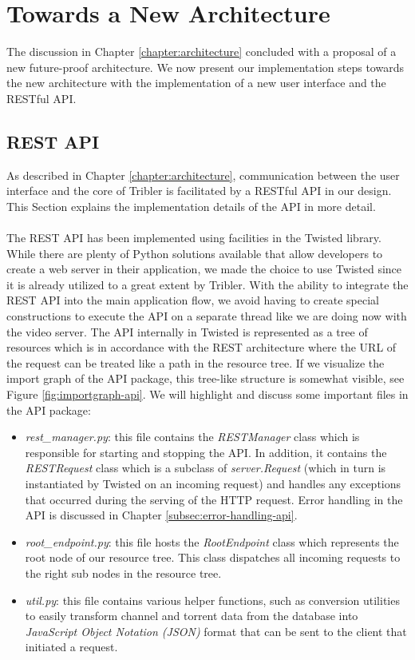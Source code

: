 \chapter{Towards a New Architecture}
\label{chapter:towards-new-architecture}
The discussion in Chapter \ref{chapter:architecture} concluded with a proposal of a new future-proof architecture. We now present our implementation steps towards the new architecture with the implementation of a new user interface and the RESTful API.

\section{REST API}
As described in Chapter \ref{chapter:architecture}, communication between the user interface and the core of Tribler is facilitated by a RESTful API in our design. This Section explains the implementation details of the API in more detail.\\\\
The REST API has been implemented using facilities in the Twisted library. While there are plenty of Python solutions available that allow developers to create a web server in their application, we made the choice to use Twisted since it is already utilized to a great extent by Tribler. With the ability to integrate the REST API into the main application flow, we avoid having to create special constructions to execute the API on a separate thread like we are doing now with the video server. The API internally in Twisted is represented as a tree of resources which is in accordance with the REST architecture where the URL of the request can be treated like a path in the resource tree. If we visualize the import graph of the API package, this tree-like structure is somewhat visible, see Figure \ref{fig:importgraph-api}. We will highlight and discuss some important files in the API package:
\begin{itemize}
	\item \emph{rest\_manager.py}: this file contains the \emph{RESTManager} class which is responsible for starting and stopping the API. In addition, it  contains the \emph{RESTRequest} class which is a subclass of \emph{server.Request} (which in turn is instantiated by Twisted on an incoming request) and handles any exceptions that occurred during the serving of the HTTP request. Error handling in the API is discussed in Chapter \ref{subsec:error-handling-api}.
	\item \emph{root\_endpoint.py}: this file hosts the \emph{RootEndpoint} class which represents the root node of our resource tree. This class dispatches all incoming requests to the right sub nodes in the resource tree.
	\item \emph{util.py}: this file contains various helper functions, such as conversion utilities to easily transform channel and torrent data from the database into \emph{JavaScript Object Notation (JSON)} format that can be sent to the client that initiated a request.
\end{itemize}

